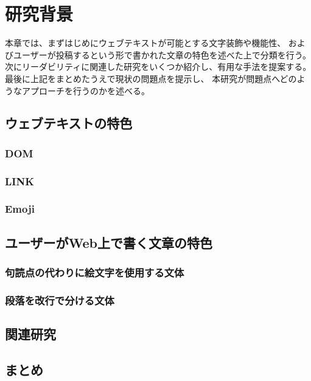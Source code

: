\chapter{研究背景}
\label{chap:system}

本章では、まずはじめにウェブテキストが可能とする文字装飾や機能性、
およびユーザーが投稿するという形で書かれた文章の特色を述べた上で分類を行う。
次にリーダビリティに関連した研究をいくつか紹介し、有用な手法を提案する。
最後に上記をまとめたうえで現状の問題点を提示し、
本研究が問題点へどのようなアプローチを行うのかを述べる。

\section{ウェブテキストの特色}

\subsection{DOM}
\subsection{LINK}
\subsection{Emoji}

\section{ユーザーがWeb上で書く文章の特色}

\subsection{句読点の代わりに絵文字を使用する文体}
\subsection{段落を改行で分ける文体}


\section{関連研究}

\section{まとめ}
